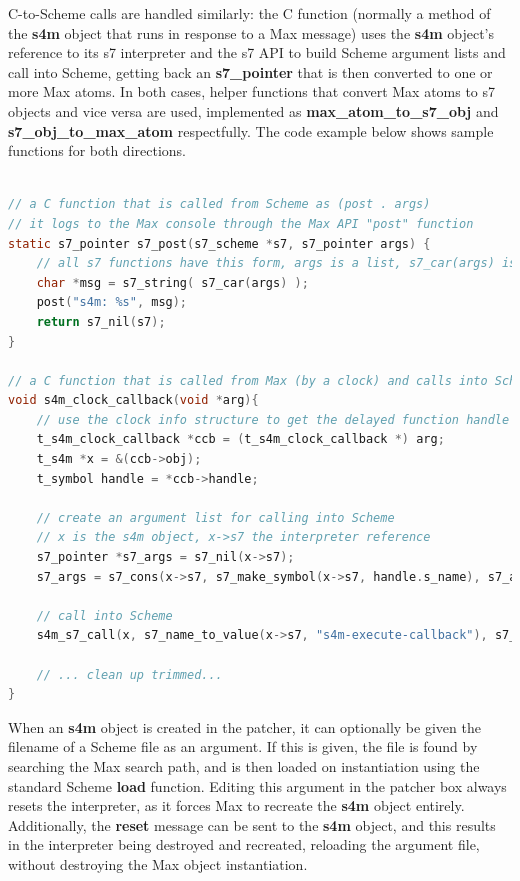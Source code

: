 \documentclass[acmsmall]{acmart}
\begin{document}
C-to-Scheme calls are handled similarly: the C function (normally a method
of the \textbf{s4m} object that runs in response to a Max message) uses the
\textbf{s4m} object's reference to its s7 interpreter and the s7 API to build
Scheme argument lists and call into Scheme, getting back an \textbf{s7\_pointer} that
is then converted to one or more Max atoms. In both cases, helper
functions that convert Max atoms to s7 objects and vice versa are used, 
implemented as \textbf{max\_atom\_to\_s7\_obj} and \textbf{s7\_obj\_to\_max\_atom}
respectfully. The code example below shows sample functions for both directions.

\begin{lstlisting}[language=C]

// a C function that is called from Scheme as (post . args)
// it logs to the Max console through the Max API "post" function
static s7_pointer s7_post(s7_scheme *s7, s7_pointer args) {
    // all s7 functions have this form, args is a list, s7_car(args) is the first arg, etc 
    char *msg = s7_string( s7_car(args) );
    post("s4m: %s", msg);
    return s7_nil(s7);
}

// a C function that is called from Max (by a clock) and calls into Scheme
void s4m_clock_callback(void *arg){
    // use the clock info structure to get the delayed function handle
    t_s4m_clock_callback *ccb = (t_s4m_clock_callback *) arg;
    t_s4m *x = &(ccb->obj);
    t_symbol handle = *ccb->handle; 
    
    // create an argument list for calling into Scheme
    // x is the s4m object, x->s7 the interpreter reference
    s7_pointer *s7_args = s7_nil(x->s7);
    s7_args = s7_cons(x->s7, s7_make_symbol(x->s7, handle.s_name), s7_args);

    // call into Scheme 
    s4m_s7_call(x, s7_name_to_value(x->s7, "s4m-execute-callback"), s7_args);   
    
    // ... clean up trimmed... 
}

\end{lstlisting}

When an \textbf{s4m} object is created in the patcher, it can optionally be given
the filename of a Scheme file as an argument. If this is given, the
file is found by searching the Max search path, and is then loaded on 
instantiation using the standard Scheme \textbf{load} function.
Editing this argument in the patcher box always resets the
interpreter, as it forces Max to recreate the \textbf{s4m} object entirely. Additionally,
the \textbf{reset} message can be sent to the \textbf{s4m} object, and this results in 
the interpreter being destroyed and recreated, reloading the argument file,
without destroying the Max object instantiation.
\end{document}
